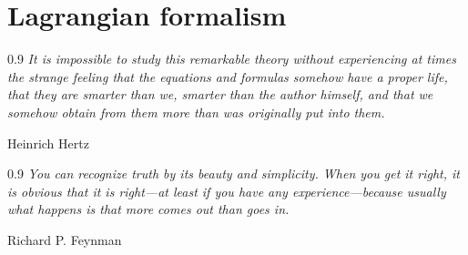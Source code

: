 \documentclass[1p,sort&compress]{elsarticle}
\numberwithin{equation}{section}
\newcommand\epigraph[3]{
\vspace{1em}\hfill{}\begin{minipage}{#1}{\begin{spacing}{0.9}
\small\noindent\textit{#2}\end{spacing}
\vspace{1em}
\hfill{}{#3}}\vspace{2em}
\end{minipage}}
\begin{document}

\section{Lagrangian formalism}\label{sec:lagrangian}

\epigraph{4.5in}{It is impossible to study this remarkable theory without experiencing at times the strange feeling that the equations and formulas somehow have a proper life, that they are smarter than we, smarter than the author himself, and that we somehow obtain from them more than was originally put into them.}{Heinrich Hertz \cite{Hertz1889bis}}

\epigraph{4.5in}{You can recognize truth by its beauty and simplicity. When you get it right, it is obvious that it is right---at least if you have any experience---because usually what happens is that more comes out than goes in. 
}{Richard P. Feynman \cite{Cole1985}}

\end{document}
